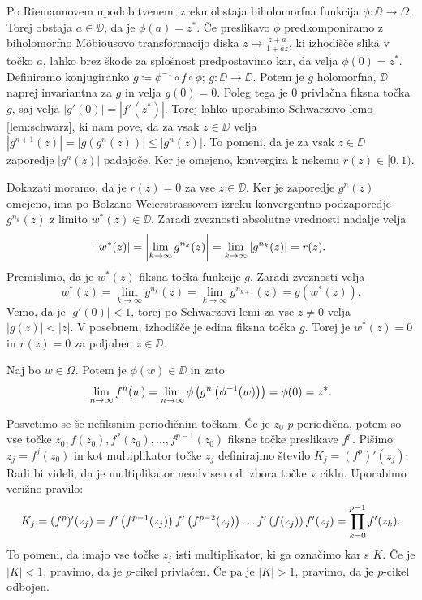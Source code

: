\begin{dokaz}
    Po Riemannovem upodobitvenem izreku obstaja biholomorfna funkcija \(\phi \colon \DD \to \Omega\). Torej obstaja \(a \in \DD\), da je \(\phi (a) = z^*\). Če preslikavo \(\phi\) predkomponiramo z biholomorfno M\"{o}biousovo transformacijo diska \(z \mapsto \frac{z+a}{1+\bar{a}z}\), ki izhodišče slika v točko \(a\), lahko brez škode za splošnost predpostavimo kar, da velja \(\phi (0) = z^*\). Definiramo konjugiranko \(g \coloneq \phi^{-1} \circ f \circ \phi\); \(g \colon \DD \to \DD\). Potem je \(g\) holomorfna, \(\DD\) naprej invariantna za \(g\) in velja \(g (0) = 0\). Poleg tega je \(0\) privlačna fiksna točka \(g\), saj velja \(| g' (0) | = | f' (z^*) |\). Torej lahko uporabimo Schwarzovo lemo \ref{lem:schwarz}, ki nam pove, da za vsak \(z \in \DD\)  velja \(|g^{n+1} (z)| = |g (g^n (z))| \leq |g^n (z)|\). To pomeni, da je za vsak \(z \in \DD\) zaporedje \(|g^n (z)|\) padajoče. Ker je omejeno, konvergira k nekemu \(r (z) \in [0, 1)\).

    Dokazati moramo, da je \(r (z) = 0\) za vse \(z \in \DD\). Ker je zaporedje \(g^n (z)\) omejeno, ima po Bolzano-Weierstrassovem izreku konvergentno podzaporedje \(g^{n_k} (z)\) z limito \(w^* (z) \in \DD\). Zaradi zveznosti absolutne vrednosti nadalje velja
    \[|w^* (z)| = \left\lvert\lim_{k \to \infty} g^{n_k} (z)\right\rvert = \lim_{k \to \infty} |g^{n_k} (z)| = r (z).\]
    Premislimo, da je \(w^* (z)\) fiksna točka funkcije \(g\). Zaradi zveznosti velja
    \[w^* (z) = \lim_{k \to \infty} g^{n_k} (z) = \lim_{k \to \infty} g^{n_{k+1}} (z) = g (w^* (z)).\]
    Vemo, da je \(| g' (0) | < 1\), torej po Schwarzovi lemi za vse \(z \neq 0\) velja \(| g (z) | < |z|\). V posebnem, izhodišče je edina fiksna točka \(g\). Torej je \(w^* (z) = 0\) in \(r (z) = 0\) za poljuben \(z \in \DD\).

    Naj bo \(w \in \Omega\). Potem je \(\phi (w) \in \DD\) in zato
    \[\lim_{n \to \infty} f^n (w) = \lim_{n \to \infty} \phi \left( g^{n} \left( \phi^{-1} (w) \right) \right) = \phi (0) = z^*.\]
\end{dokaz}

Posvetimo se še nefiksnim periodičnim točkam. Če je \(z_0\) \(p\)-periodična, potem so vse točke \(z_0, f (z_0), f^2 (z_0), \dots, f^{p - 1} (z_0)\) fiksne točke preslikave \(f^p\). Pišimo \(z_j = f^j (z_0)\) in kot multiplikator točke \(z_j\) definirajmo število \(K_j = (f^p)' (z_j)\). Radi bi videli, da je multiplikator neodvisen od izbora točke v ciklu. Uporabimo verižno pravilo:
\[K_j = (f^p)' (z_j) = f' \left( f^{p - 1} (z_j) \right) f' \left( f^{p - 2} (z_j) \right) \dots f' \left( f (z_j) \right) f' (z_j) = \prod_{k = 0}^{p - 1} f' (z_k).\]
To pomeni, da imajo vse točke \(z_j\) isti multiplikator, ki ga označimo kar s \(K\). Če je \(|K| < 1\), pravimo, da je \(p\)-cikel privlačen. Če pa je \(|K| > 1\), pravimo, da je \(p\)-cikel odbojen.

